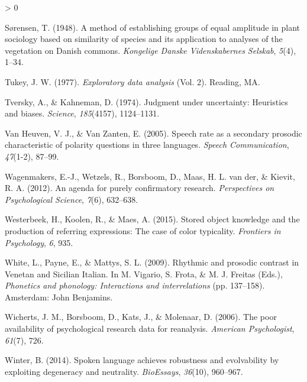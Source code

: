 \documentclass[
  english,
  man,floatsintext]{apa6}
\newlength{\cslhangindent}
\newenvironment{CSLReferences}[2] %
 {%
  \setlength{\parindent}{0pt}
  \ifodd #1 \everypar{\setlength{\hangindent}{\cslhangindent}}\ignorespaces\fi
  \ifnum #2 > 0
  \setlength{\parskip}{#2\baselineskip}
  \fi
 }%
 {}
\begin{document}
\begin{CSLReferences}{1}{0}
\leavevmode\hypertarget{ref-sorensen1948}{}%
Sørensen, T. (1948). A method of establishing groups of equal amplitude in plant sociology based on similarity of species and its application to analyses of the vegetation on {D}anish commons. \emph{Kongelige Danske Videnskabernes Selskab}, \emph{5}(4), 1--34.

\leavevmode\hypertarget{ref-tukey1977exploratory}{}%
Tukey, J. W. (1977). \emph{Exploratory data analysis} (Vol. 2). Reading, MA.

\leavevmode\hypertarget{ref-tversky1974judgment}{}%
Tversky, A., \& Kahneman, D. (1974). Judgment under uncertainty: Heuristics and biases. \emph{Science}, \emph{185}(4157), 1124--1131.

\leavevmode\hypertarget{ref-van2005speech}{}%
Van Heuven, V. J., \& Van Zanten, E. (2005). Speech rate as a secondary prosodic characteristic of polarity questions in three languages. \emph{Speech Communication}, \emph{47}(1-2), 87--99.

\leavevmode\hypertarget{ref-wagenmakers2012agenda}{}%
Wagenmakers, E.-J., Wetzels, R., Borsboom, D., Maas, H. L. van der, \& Kievit, R. A. (2012). An agenda for purely confirmatory research. \emph{Perspectives on Psychological Science}, \emph{7}(6), 632--638.

\leavevmode\hypertarget{ref-westerbeek2015stored}{}%
Westerbeek, H., Koolen, R., \& Maes, A. (2015). Stored object knowledge and the production of referring expressions: The case of color typicality. \emph{Frontiers in Psychology}, \emph{6}, 935.

\leavevmode\hypertarget{ref-white2009}{}%
White, L., Payne, E., \& Mattys, S. L. (2009). Rhythmic and prosodic contrast in {V}enetan and {S}icilian {I}talian. In M. Vigario, S. Frota, \& M. J. Freitas (Eds.), \emph{Phonetics and phonology: Interactions and interrelations} (pp. 137--158). Amsterdam: John Benjamins.

\leavevmode\hypertarget{ref-wicherts2006poor}{}%
Wicherts, J. M., Borsboom, D., Kats, J., \& Molenaar, D. (2006). The poor availability of psychological research data for reanalysis. \emph{American Psychologist}, \emph{61}(7), 726.

\leavevmode\hypertarget{ref-winter2014spoken}{}%
Winter, B. (2014). Spoken language achieves robustness and evolvability by exploiting degeneracy and neutrality. \emph{BioEssays}, \emph{36}(10), 960--967.

\end{CSLReferences}

\endgroup
\end{document}

